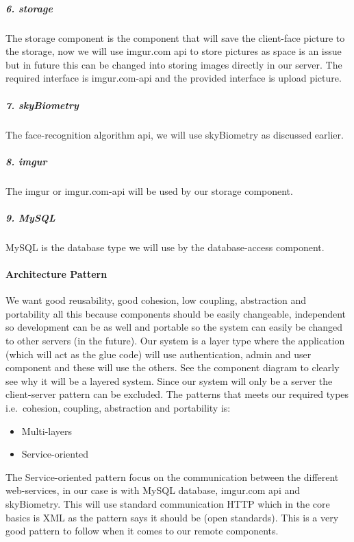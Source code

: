 \documentclass[a4paper,11pt]{article}
\begin{document}
\subparagraph{6. storage}\label{storage}

The storage component is the component that will save the client-face
picture to the storage, now we will use imgur.com api to store pictures
as space is an issue but in future this can be changed into storing
images directly in our server. The required interface is imgur.com-api
and the provided interface is upload picture.

\subparagraph{7. skyBiometry}\label{skybiometry}

The face-recognition algorithm api, we will use skyBiometry as discussed
earlier.

\subparagraph{8. imgur}\label{imgur}

The imgur or imgur.com-api will be used by our storage component.

\subparagraph{9. MySQL}\label{mysql}

MySQL is the database type we will use by the database-access component.

\paragraph{Architecture Pattern}\label{architecture-pattern}

We want good reusability, good cohesion, low coupling, abstraction and
portability all this because components should be easily changeable,
independent so development can be as well and portable so the system can
easily be changed to other servers (in the future). Our system is a
layer type where the application (which will act as the glue code) will
use authentication, admin and user component and these will use the
others. See the component diagram to clearly see why it will be a
layered system. Since our system will only be a server the client-server
pattern can be excluded. The patterns that meets our required types
i.e.~cohesion, coupling, abstraction and portability is:

\begin{itemize}
\item
  Multi-layers
\item
  Service-oriented
\end{itemize}

The Service-oriented pattern focus on the communication between the
different web-services, in our case is with MySQL database, imgur.com
api and skyBiometry. This will use standard communication HTTP which in
the core basics is XML as the pattern says it should be (open
standards). This is a very good pattern to follow when it comes to our
remote components.
\end{document}
